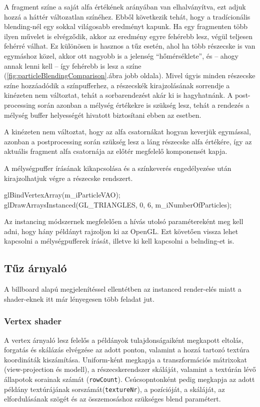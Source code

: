 A fragment színe a saját alfa értékének arányában van elhalványítva, ezt adjuk hozzá a háttér változatlan színéhez. Ebből következik tehát, hogy a tradícionális blending-nél egy sokkal világosabb eredményt kapunk. Ha egy fragmenten több ilyen művelet is elvégződik, akkor az eredmény egyre fehérebb lesz, végül teljesen fehérré válhat. Ez különösen is hasznos a tűz esetén, ahol ha több részecske is van egymáshoz közel, akkor ott nagyobb is a jelenség ``hőmérséklete'', és -- ahogy annak lenni kell -- így fehérebb is lesz a színe (\ref{fig:particleBlendingComparison}.ábra jobb oldala). Mivel úgyis minden részecske színe hozzáadódik a színpufferhez, a részecskék kirajzolásának sorrendje a kinézeten nem változtat, tehát a sorbarendezést akár ki is hagyhatnánk. A post-processing során azonban a mélység értékekre is szükség lesz, tehát a rendezés a mélység buffer helyességét hivatott biztosítani ebben az esetben.

A kinézeten nem változtat, hogy az alfa csatornákat hogyan keverjük egymással, azonban a postprocessing során szükség lesz a láng részecske alfa értékére, így az aktuális fragment alfa csatornája az előtér megfelelő komponensét kapja.

A mélységpuffer írásának kikapcsolása és a színkeverés engedélyezése után kirajzolhatjuk végre a részecske rendszert.
\begin{cpp}
glBindVertexArray(m_iParticleVAO);
glDrawArraysInstanced(GL_TRIANGLES, 0, 6, m_iNumberOfParticles);
\end{cpp}
Az instancing módszernek megfelelően a hívás utolsó paramétereként meg kell adni, hogy hány példányt rajzoljon ki az OpenGL. Ezt követően vissza lehet kapcsolni a mélységpufferek írását, illetve ki kell kapcsolni a belnding-et is.

\subsection{Tűz árnyaló}
A billboard alapú megjelenítéssel ellentétben az instanced render-elés miatt a shader-eknek itt már lényegesen több feladat jut. 

\subsubsection{Vertex shader}
A vertex árnyaló lesz felelős a példányok tulajdonságaiként megkapott eltolás, forgatás és skálázás elvégzése az adott ponton, valamint a hozzá tartozó textúra koordináták kiszámítása. Uniform-ként megkapja a transzformációs mátrixokat (view-projection és modell), a részecskerendszer skáláját, valamint a textúrán lévő állapotok sorainak számát (\texttt{rowCount}). Csúcsopntonként pedig megkapja az adott példány textúrájának sorszámát(\texttt{textureNr}), a pozícióját, a skáláját, az elfordulásának szögét és az összemosáshoz szükséges blend paramétert. 

